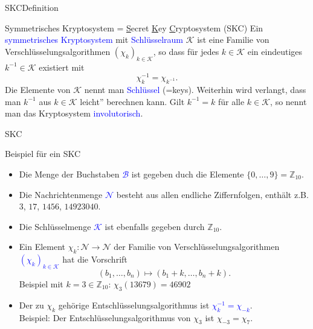 \documentclass{beamer}
\newcommand{\mc}{\mathcal}
\newcommand{\Z}{\mathbb{Z}}
\newcommand{\tb}[1]{{\textcolor{blue}{#1}}}
\theoremstyle{plain}
\begin{document}
\begin{frame}{SKC}{Definition}
\begin{block}{Symmetrisches Kryptosystem = \underline{S}ecret \underline{K}ey \underline{C}ryptosystem (SKC)}
 Ein \tb{symmetrisches Kryptosystem} mit \tb{Schlüsselraum} $\mc K$ ist eine Familie von Verschlüsselungsalgorithmen $(\chi_k)_{k \in \mc K}$, so dass für jedes $k \in \mc K$ ein eindeutiges $k^{-1} \in \mc K$ existiert mit $$\chi_k^{-1} = \chi_{k^{-1}}.$$ \pause
 Die Elemente von $\mc K$ nennt man \tb{Schlüssel} (=keys). Weiterhin wird verlangt, dass man $k^{-1}$ aus $k \in \mc K$ \glqq leicht'' berechnen kann. Gilt $k^{-1} = k$ für alle $k \in \mc K$, so nennt man das Kryptosystem \tb{involutorisch}. 
\end{block} 
\end{frame}

\begin{frame}{SKC}{~}
 \begin{block}{Beispiel für ein SKC}
  \begin{itemize}[<+->]
   \item Die Menge der Buchstaben \tb{$\mc B$} ist gegeben duch die Elemente $\{0, \dots, 9\} = \Z_{10}$. 
   \item Die Nachrichtenmenge \tb{$\mc N$} besteht aus allen endliche Ziffernfolgen, enthält z.B. $3$, $17$, $1456$, $14923040$.
   \item Die Schlüsselmenge \tb{$\mc K$} ist ebenfalls gegeben durch $\Z_{10}$. 
   \item Ein Element $\chi_k: \mc N \rightarrow \mc N$ der Familie von Verschlüsselungsalgorithmen \tb{$(\chi_k)_{k \in \mc K}$} hat die Vorschrift $$(b_1, \dots, b_n) \mapsto (b_1 + k, \dots, b_n + k).$$ 
   Beispiel mit $k = 3 \in \Z_{10}$: $\chi_3(13679) = 46902$
   \item Der zu $\chi_k$ gehörige Entschlüsselungsalgorithmus ist \tb{$\chi_k^{-1} = \chi_{-k}$}.\\
   Beispiel: Der Entschlüsselungsalgorithmus von $\chi_3$ ist $\chi_{-3} = \chi_{7}$. 
  \end{itemize}
 \end{block}
\end{frame}
\end{document}
